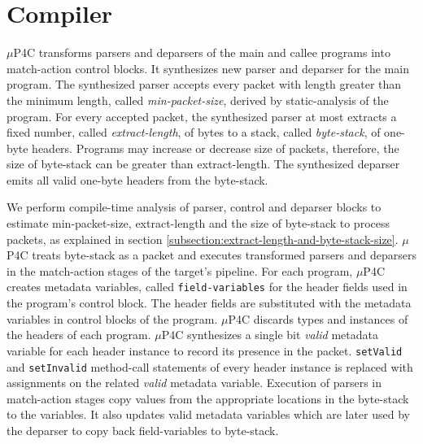 






\section{Compiler}
$\mu$P4C transforms parsers and deparsers of the main and callee programs into match-action control blocks.
It synthesizes new parser and deparser for the main program.
The synthesized parser accepts every packet with length greater than the minimum length, called \emph{min-packet-size}, derived by static-analysis of the program.
For every accepted packet, the synthesized parser at most extracts a fixed number, called \emph{extract-length}, of bytes to a stack, called \emph{byte-stack}, of one-byte headers.
Programs may increase or decrease size of packets, therefore, the size of byte-stack can be greater than extract-length.
The synthesized deparser emits all valid one-byte headers from the byte-stack.




We perform compile-time analysis of parser, control and deparser blocks to estimate min-packet-size, extract-length and the size of byte-stack to process packets, as explained in section \ref{subsection:extract-length-and-byte-stack-size}. 
$\mu$P4C treats byte-stack as a packet and executes transformed parsers and deparsers in the match-action stages of the target's pipeline.
For each program, $\mu$P4C creates metadata variables, called \texttt{field-variables} for the header fields used in the program's control block.
The header fields are substituted with the metadata variables in control blocks of the program.
$\mu$P4C discards types and instances of the headers of each program.
$\mu$P4C synthesizes a single bit \emph{valid} metadata variable for each header instance to record its presence in the packet.
\texttt{setValid} and \texttt{setInvalid} method-call statements of every header instance is replaced with assignments on the related \emph{valid} metadata variable.
Execution of parsers in match-action stages copy values from the appropriate locations in the byte-stack to the variables.
It also updates valid metadata variables which are later used by the deparser to copy back field-variables to byte-stack.


